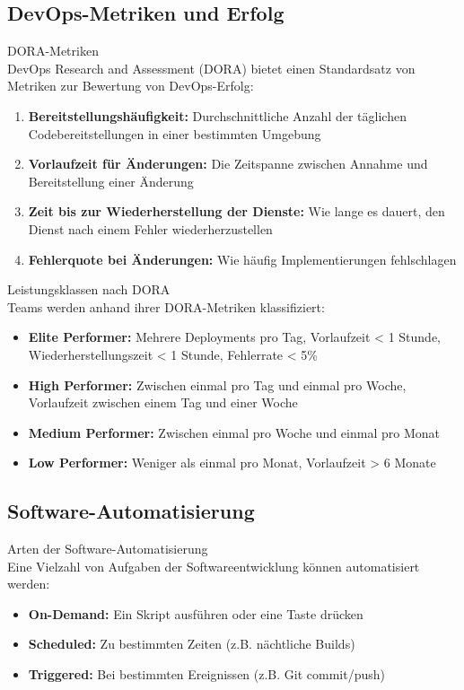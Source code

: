 \subsection{DevOps-Metriken und Erfolg}

\begin{definition}{DORA-Metriken}\\
    DevOps Research and Assessment (DORA) bietet einen Standardsatz von Metriken zur Bewertung von DevOps-Erfolg:
    \begin{enumerate}
        \item \textbf{Bereitstellungshäufigkeit:} Durchschnittliche Anzahl der täglichen Codebereitstellungen in einer bestimmten Umgebung
        \item \textbf{Vorlaufzeit für Änderungen:} Die Zeitspanne zwischen Annahme und Bereitstellung einer Änderung
        \item \textbf{Zeit bis zur Wiederherstellung der Dienste:} Wie lange es dauert, den Dienst nach einem Fehler wiederherzustellen
        \item \textbf{Fehlerquote bei Änderungen:} Wie häufig Implementierungen fehlschlagen
    \end{enumerate}
\end{definition}

\begin{concept}{Leistungsklassen nach DORA}\\
    Teams werden anhand ihrer DORA-Metriken klassifiziert:
    \begin{itemize}
        \item \textbf{Elite Performer:} Mehrere Deployments pro Tag, Vorlaufzeit < 1 Stunde, Wiederherstellungszeit < 1 Stunde, Fehlerrate < 5\%
        \item \textbf{High Performer:} Zwischen einmal pro Tag und einmal pro Woche, Vorlaufzeit zwischen einem Tag und einer Woche
        \item \textbf{Medium Performer:} Zwischen einmal pro Woche und einmal pro Monat
        \item \textbf{Low Performer:} Weniger als einmal pro Monat, Vorlaufzeit > 6 Monate
    \end{itemize}
\end{concept}

\subsection{Software-Automatisierung}

\begin{definition}{Arten der Software-Automatisierung}\\
    Eine Vielzahl von Aufgaben der Softwareentwicklung können automatisiert werden:
    \begin{itemize}
        \item \textbf{On-Demand:} Ein Skript ausführen oder eine Taste drücken
        \item \textbf{Scheduled:} Zu bestimmten Zeiten (z.B. nächtliche Builds)
        \item \textbf{Triggered:} Bei bestimmten Ereignissen (z.B. Git commit/push)
    \end{itemize}
\end{definition}

